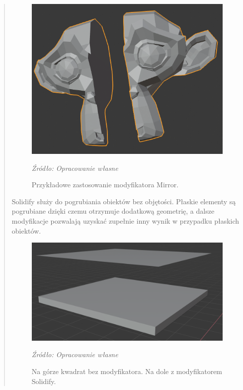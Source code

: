 \begin{quotation}
\begin{figure}[!hbt]
\centering
  \includegraphics[width=1\linewidth]{mirror.png}
  \caption{Przykładowe zastosowanie modyfikatora Mirror.}\label{rys_5}
  \begin{minipage}[t]{0.75\linewidth}
    \emph{Źródło: Opracowanie własne}
  \end{minipage}
\end{figure}

\indent Solidify służy do pogrubiania obiektów bez objętości. Płaskie elementy są pogrubiane dzięki czemu otrzymuje dodatkową geometrię, a dalsze modyfikacje pozwalają uzyskać zupełnie inny wynik w przypadku płaskich obiektów.
\begin{figure}[!hbt]
\centering
  \includegraphics[width=0.8\linewidth]{solidify.png}
  \caption{Na górze kwadrat bez modyfikatora. Na dole z modyfikatorem Solidify.}\label{rys_6}
  \begin{minipage}[t]{0.75\linewidth}
    \emph{Źródło: Opracowanie własne}
  \end{minipage}
\end{figure}


\end{quotation}
